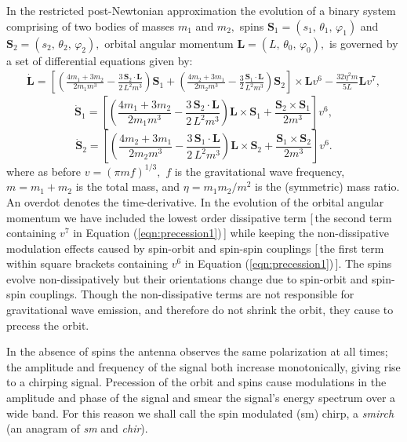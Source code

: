 In the restricted post-Newtonian approximation the evolution of a binary 
system comprising of two bodies of masses $m_1$ and $m_2,$ spins 
${\mathbf S}_1=(s_1,\, \theta_1, \, \varphi_1)$ and 
${\mathbf S}_2=(s_2,\, \theta_2, \, \varphi_2),$ orbital angular momentum
${\mathbf L}=(L,\, \theta_0, \, \varphi_0),$ is governed by a 
set of differential equations given by:
\begin{eqnarray}
\dot{\mathbf {L}} = 
\left [ 
\left ( \frac{4m_1+3m_2}{2m_1m^3} - \frac{3\,  {\mathbf S}_2 \cdot {\mathbf L}}{2\, L^2m^3} \right ) {\mathbf S}_1 + 
\left ( \frac{4m_2+3m_1}{2m_2m^3} - \frac{3}{2}\frac{ {\mathbf S}_1 \cdot {\mathbf L}}{L^2m^3} \right ) {\mathbf S}_2 
\right ] \times {\mathbf L} v^6 -\frac{32\eta^2 m}{5L} {\mathbf L} v^7,
\label{eqn:precession1}
\end{eqnarray}
\begin{equation}
\dot{ \mathbf  S}_1  = 
\left [ \left ( \frac{4m_1+3m_2}{2m_1m^3} - \frac{3\, {\mathbf S}_2 \cdot {\mathbf L} }{2\, L^2m^3} 
\right ) {\mathbf L} \times {\mathbf S}_1 + \frac{ {\mathbf S}_2 \times {\mathbf S}_1 }{2m^3} \right ] v^6,
\label{eqn:precession2} 
\end{equation}
\begin{equation}
\dot{ \mathbf  S}_2  = 
\left [ \left ( \frac{4m_2+3m_1}{2m_2m^3} - \frac{3\, {\mathbf S}_1 \cdot {\mathbf L} }{2\, L^2m^3} 
\right ) {\mathbf L} \times {\mathbf S}_2 + \frac{ {\mathbf S}_1 \times {\mathbf S}_2 }{2m^3} \right ] v^6.
\label{eqn:precession3} 
\end{equation}
where as before $v=(\pi m f)^{1/3},$ $f$ is the gravitational wave frequency,
$m = m_1+m_2$ is the total mass, and $\eta = m_1m_2/m^2$ is
the (symmetric) mass ratio.  An overdot denotes the time-derivative.
In the evolution of the orbital angular momentum we have included 
the lowest order dissipative term [\,the second term containing 
$v^7$ in Equation (\ref{eqn:precession1})\,] 
while keeping the non-dissipative modulation effects
caused by spin-orbit and spin-spin couplings
[\,the first term within square brackets containing 
$v^6$ in Equation (\ref{eqn:precession1})\,]. 
The spins evolve non-dissipatively but their orientations change due to 
spin-orbit and spin-spin couplings. 
Though the non-dissipative terms are not responsible for
gravitational wave emission, and therefore do not shrink the
orbit, they cause to precess the orbit.

In the absence of spins the antenna observes the same polarization at 
all times; the amplitude and frequency of the signal both
increase monotonically, giving rise to a chirping signal. 
Precession of the orbit and spins cause modulations in the amplitude
and phase of the signal and smear the signal's energy spectrum over a wide band.
For this reason we shall call the spin modulated (sm) chirp, 
a {\it smirch} (an anagram of {\it sm} and {\it chir}).

